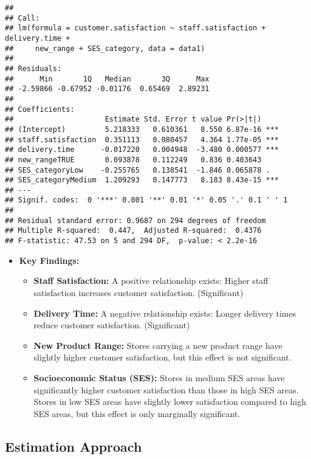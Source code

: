 \documentclass[
]{article}
\begin{document}
\begin{verbatim}
## 
## Call:
## lm(formula = customer.satisfaction ~ staff.satisfaction + delivery.time + 
##     new_range + SES_category, data = data1)
## 
## Residuals:
##      Min       1Q   Median       3Q      Max 
## -2.59866 -0.67952 -0.01176  0.65469  2.89231 
## 
## Coefficients:
##                     Estimate Std. Error t value Pr(>|t|)    
## (Intercept)         5.218333   0.610361   8.550 6.87e-16 ***
## staff.satisfaction  0.351113   0.080457   4.364 1.77e-05 ***
## delivery.time      -0.017220   0.004948  -3.480 0.000577 ***
## new_rangeTRUE       0.093878   0.112249   0.836 0.403643    
## SES_categoryLow    -0.255765   0.138541  -1.846 0.065878 .  
## SES_categoryMedium  1.209293   0.147773   8.183 8.43e-15 ***
## ---
## Signif. codes:  0 '***' 0.001 '**' 0.01 '*' 0.05 '.' 0.1 ' ' 1
## 
## Residual standard error: 0.9687 on 294 degrees of freedom
## Multiple R-squared:  0.447,  Adjusted R-squared:  0.4376 
## F-statistic: 47.53 on 5 and 294 DF,  p-value: < 2.2e-16
\end{verbatim}

\begin{itemize}
\item
  \textbf{Key Findings:}

  \begin{itemize}
  \item
    \textbf{Staff Satisfaction:} A positive relationship exists: Higher
    staff satisfaction increases customer satisfaction. (Significant)
  \item
    \textbf{Delivery Time:} A negative relationship exists: Longer
    delivery times reduce customer satisfaction. (Significant)
  \item
    \textbf{New Product Range:} Stores carrying a new product range have
    slightly higher customer satisfaction, but this effect is not
    significant.
  \item
    \textbf{Socioeconomic Status (SES):} Stores in medium SES areas have
    significantly higher customer satisfaction than those in high SES
    areas. Stores in low SES areas have slightly lower satisfaction
    compared to high SES areas, but this effect is only marginally
    significant.
  \end{itemize}
\end{itemize}

\subsection{Estimation Approach}\label{estimation-approach-1}
\end{document}
